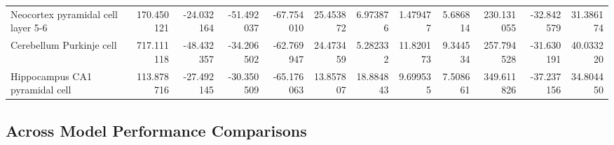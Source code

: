 \begin{tabular}{lrrrrrrrrrrr}
Neocortex pyramidal cell layer 5-6 &  170.450121 & -24.032164 & -51.492037 & -67.754010 &  25.453872 &   6.973876 &   1.479477 &  5.686814 &  230.131055 & -32.842579 &    31.386174 \\
Cerebellum Purkinje cell           &  717.111118 & -48.432357 & -34.206502 & -62.769947 &  24.473459 &   5.282332 &  11.820173 &  9.344534 &  257.794528 & -31.630191 &    40.033220 \\
Hippocampus CA1 pyramidal cell     &  113.878716 & -27.492145 & -30.350509 & -65.176063 &  13.857807 &  18.884843 &   9.699535 &  7.508661 &  349.611826 & -37.237156 &    34.804450 \\
\bottomrule
\end{tabular}


\subsection{Across Model Performance Comparisons}
